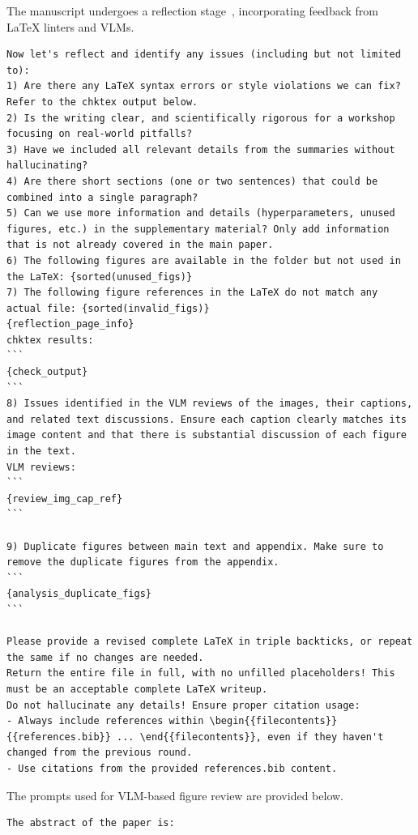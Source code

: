\begin{appendices}
The manuscript undergoes a reflection stage~\citep{shinn2023reflexion}, incorporating feedback from LaTeX linters and VLMs.
\begin{tcolorbox}[breakable, colback=orange!5!white, colframe=orange!80!black, title=Manuscript Writing Reflection Prompt]
\begin{Verbatim}[breaklines, breaksymbol={}, breaksymbolleft={}, fontsize=\small]
Now let's reflect and identify any issues (including but not limited to):
1) Are there any LaTeX syntax errors or style violations we can fix? Refer to the chktex output below.
2) Is the writing clear, and scientifically rigorous for a workshop focusing on real-world pitfalls?
3) Have we included all relevant details from the summaries without hallucinating?
4) Are there short sections (one or two sentences) that could be combined into a single paragraph?
5) Can we use more information and details (hyperparameters, unused figures, etc.) in the supplementary material? Only add information that is not already covered in the main paper.
6) The following figures are available in the folder but not used in the LaTeX: {sorted(unused_figs)}
7) The following figure references in the LaTeX do not match any actual file: {sorted(invalid_figs)}
{reflection_page_info}
chktex results:
```
{check_output}
```
8) Issues identified in the VLM reviews of the images, their captions, and related text discussions. Ensure each caption clearly matches its image content and that there is substantial discussion of each figure in the text.
VLM reviews:
```
{review_img_cap_ref}
```

9) Duplicate figures between main text and appendix. Make sure to remove the duplicate figures from the appendix.
```
{analysis_duplicate_figs}
```

Please provide a revised complete LaTeX in triple backticks, or repeat the same if no changes are needed.
Return the entire file in full, with no unfilled placeholders! This must be an acceptable complete LaTeX writeup.
Do not hallucinate any details! Ensure proper citation usage:
- Always include references within \begin{{filecontents}}{{references.bib}} ... \end{{filecontents}}, even if they haven't changed from the previous round.
- Use citations from the provided references.bib content.
\end{Verbatim}
\end{tcolorbox}

The prompts used for VLM-based figure review are provided below.
\begin{tcolorbox}[breakable, colback=orange!5!white, colframe=orange!80!black, title=VLM Figure Review Prompt]
\begin{Verbatim}[breaklines, breaksymbol={}, breaksymbolleft={}, fontsize=\small]
The abstract of the paper is:


\end{Verbatim}
\end{tcolorbox}
\end{appendices}
